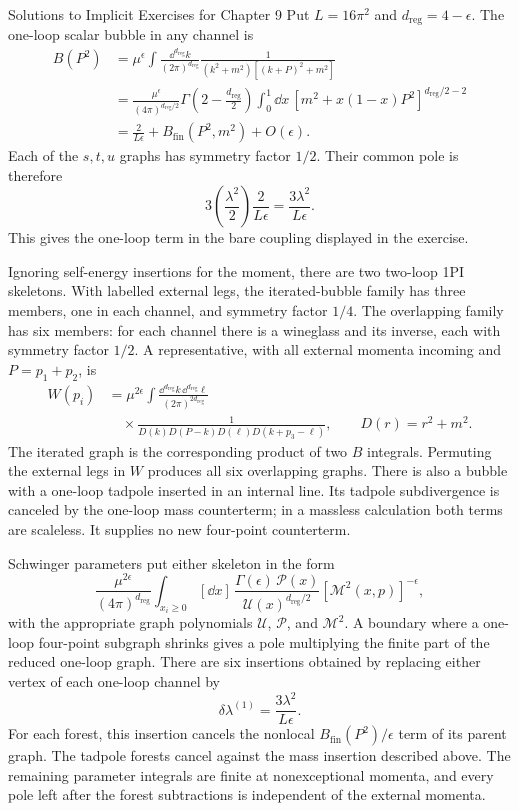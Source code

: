 \begin{bankssolutions}{Solutions to Implicit Exercises for Chapter 9}
Put $L=16\pi^2$ and $d_{\mathrm{reg}}=4-\epsilon$.  The one-loop scalar bubble in any channel is
\begin{align*}
  B(P^2)&=\mu^\epsilon\int\frac{\dd^{d_{\mathrm{reg}}}k}{(2\pi)^{d_{\mathrm{reg}}}}
  \frac{1}{(k^2+m^2)[(k+P)^2+m^2]}\\
  &=\frac{\mu^\epsilon}{(4\pi)^{d_{\mathrm{reg}}/2}}
  \Gamma\!\left(2-\frac {d_{\mathrm{reg}}}{2}\right)
  \int_0^1\dd x\,[m^2+x(1-x)P^2]^{d_{\mathrm{reg}}/2-2}\\
  &=\frac{2}{L\epsilon}+B_{\mathrm{fin}}(P^2,m^2)+O(\epsilon).
\end{align*}
Each of the $s,t,u$ graphs has symmetry factor $1/2$.  Their common pole is
therefore
\[
  3\left(\frac{\lambda^2}{2}\right)
  \frac{2}{L\epsilon}=\frac{3\lambda^2}{L\epsilon}.
\]
This gives the one-loop term in the bare coupling displayed in the exercise.

Ignoring self-energy insertions for the moment, there are two two-loop 1PI
skeletons.  With labelled external legs, the iterated-bubble family has three
members, one in each channel, and symmetry factor $1/4$.  The overlapping
family has six members: for each channel there is a wineglass and its inverse,
each with symmetry factor $1/2$.  A representative, with all external momenta
incoming and $P=p_1+p_2$, is
\[
  \begin{aligned}
    W(p_i)&=\mu^{2\epsilon}
    \int\frac{\dd^{d_{\mathrm{reg}}}k\,\dd^{d_{\mathrm{reg}}}\ell}
    {(2\pi)^{2d_{\mathrm{reg}}}}\\[-2pt]
    &\quad\times
    \frac{1}{D(k)D(P-k)D(\ell)D(k+p_3-\ell)},
    \qquad D(r)=r^2+m^2.
  \end{aligned}
\]
The iterated graph is the corresponding product of two $B$ integrals.
Permuting the external legs in $W$ produces all six overlapping graphs.
There is also a bubble with a one-loop tadpole inserted in an internal line.
Its tadpole subdivergence is canceled by the one-loop mass counterterm; in a
massless calculation both terms are scaleless.  It supplies no new four-point
counterterm.

Schwinger parameters put either skeleton in the form
\[
  \frac{\mu^{2\epsilon}}{(4\pi)^{d_{\mathrm{reg}}}}
  \int_{x_i\geq0}\![\dd x]\,
  \frac{\Gamma(\epsilon)\,
  \mathcal P(x)}{\mathcal U(x)^{d_{\mathrm{reg}}/2}}
  [\mathcal M^2(x,p)]^{-\epsilon},
\]
with the appropriate graph polynomials $\mathcal U$, $\mathcal P$, and
$\mathcal M^2$.  A boundary where a one-loop four-point subgraph shrinks gives
a pole multiplying the finite part of the reduced one-loop graph.  There are
six insertions obtained by replacing either vertex of each one-loop channel by
\[
  \delta\lambda^{(1)}=\frac{3\lambda^2}{L\epsilon}.
\]
For each forest, this insertion cancels the nonlocal
$B_{\mathrm{fin}}(P^2)/\epsilon$ term of its parent graph.  The tadpole forests
cancel against the mass insertion described above.  The remaining parameter
integrals are finite at nonexceptional momenta, and every pole left after the
forest subtractions is independent of the external momenta.


\end{bankssolutions}
